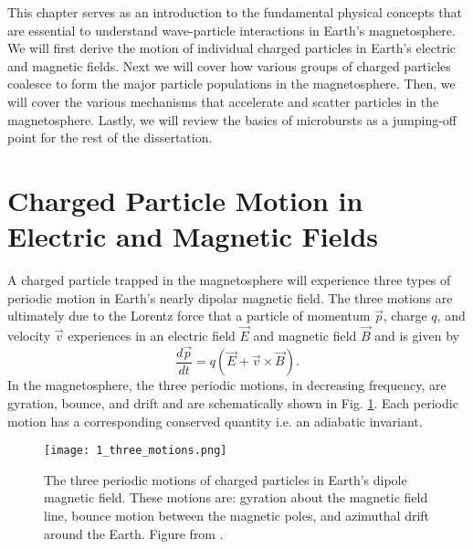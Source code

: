 This chapter serves as an introduction to the fundamental physical concepts that are essential to understand wave-particle interactions in Earth's magnetosphere. We will first derive the motion of individual charged particles in Earth's electric and magnetic fields. Next we will cover how various groups of charged particles coalesce to form the major particle populations in the magnetosphere. Then, we will cover the various mechanisms that accelerate and scatter particles in the magnetosphere. Lastly, we will review the basics of microbursts as a jumping-off point for the rest of the dissertation. 

\section{Charged Particle Motion in Electric and Magnetic Fields}\label{Intro:particle_motion}
A charged particle trapped in the magnetosphere will experience three types of periodic motion in Earth's nearly dipolar magnetic field. The three motions are ultimately due to the Lorentz force that a particle of momentum $\vec{p}$, charge $q$, and velocity $\vec{v}$ experiences in an electric field $\vec{E}$ and magnetic field $\vec{B}$ and is given by
\begin{equation} \label{Intro:Lorentz}
\frac{d\vec{p}}{dt} = q(\vec{E} + \vec{v} \times \vec{B}).
\end{equation} In the magnetosphere, the three periodic motions, in decreasing frequency, are gyration, bounce, and drift and are schematically shown in Fig. \ref{Intro:motion_diagram}. Each periodic motion has a corresponding conserved quantity i.e. an adiabatic invariant. 

\begin{figure}
\texttt{[image: 1\_three\_motions.png]}
\caption{The three periodic motions of charged particles in Earth's dipole magnetic field. These motions are: gyration about the magnetic field line, bounce motion between the magnetic poles, and azimuthal drift around the Earth. Figure from \citep{Baumjohann1997}.}
\label{Intro:motion_diagram}
\end{figure}


